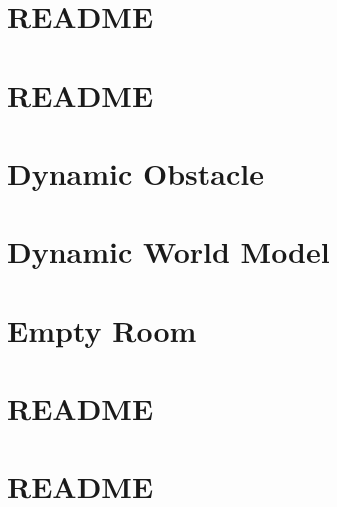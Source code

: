 \let\mypdfximage\pdfximage\def\pdfximage{\immediate\mypdfximage}\documentclass[twoside]{book}
\newcommand{\+}{\discretionary{\mbox{\scriptsize$\hookleftarrow$}}{}{}}
\begin{document}
\chapter{README}
\label{md_smacc2_sm_reference_library_sm_dance_bot_lite_README}

\chapter{README}
\label{md_smacc2_sm_reference_library_sm_dance_bot_msgs_README}

\chapter{Dynamic Obstacle}
\label{md_smacc2_sm_reference_library_sm_dance_bot_strikes_back_models_dynamic_obstacle_README}

\chapter{Dynamic World Model}
\label{md_smacc2_sm_reference_library_sm_dance_bot_strikes_back_models_dynamic_world_README}

\chapter{Empty Room}
\label{md_smacc2_sm_reference_library_sm_dance_bot_strikes_back_models_empty_room_README}

\chapter{README}
\label{md_smacc2_sm_reference_library_sm_dance_bot_strikes_back_README}

\chapter{README}
\label{md_smacc2_sm_reference_library_sm_ferrari_README}

\end{document}
